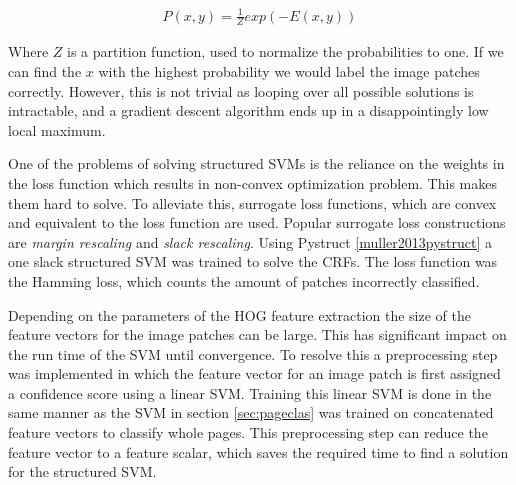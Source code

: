 \begin{align}
P(x, y) = \frac{1}{Z} exp(-E(x, y))
\end{align}

Where $Z$ is a partition function, used to normalize the probabilities to one.
If we can find the $x$ with the highest probability we would label
the image patches correctly. However, this is not trivial as
looping over all possible solutions is intractable, and a gradient descent
algorithm ends up in a disappointingly low local maximum\cite{bishop2006pattern}.

One of the problems of solving structured SVMs is the reliance on the
weights in the loss function which results in non-convex optimization problem.
This makes them hard to solve. To alleviate this, surrogate loss
functions, which are convex and equivalent to the loss function are
used. Popular surrogate loss constructions are \emph{margin rescaling} and
\emph{slack rescaling}. Using Pystruct \ref{muller2013pystruct} a one slack
structured SVM was trained \cite{joachims2009cutting} to solve the CRFs. The loss
function was the Hamming loss, which counts the amount of patches incorrectly
classified.

Depending on the parameters of the HOG feature extraction the size of the
feature vectors for the image patches can be large. This has significant impact
on the run time of the SVM until convergence. To resolve this a preprocessing
step was implemented in which the feature vector for an image patch is first
assigned a confidence score using a linear SVM. Training this linear SVM is done
in the same manner as the SVM in section \ref{sec:pageclas} was trained on
concatenated feature vectors to classify whole pages. This preprocessing step
can reduce the feature vector to a feature scalar, which saves the required time
to find a solution for the structured SVM.


